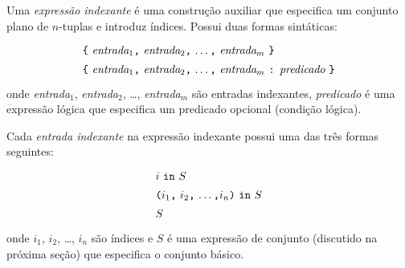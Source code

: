 \documentclass[11pt, brazil]{report}
\begin{document}
Uma {\it expressão indexante} é uma construção auxiliar que especifica um
conjunto plano de $n$-tuplas e introduz índices. Possui duas formas
sintáticas:
$$
{\def\arraystretch{1.4}
\begin{array}{l}
\mbox{{\tt\{} {\it entrada}$_1${\tt,} {\it entrada}$_2${\tt,} \dots{\tt,}
{\it entrada}$_m$ {\tt\}}}\\
\mbox{{\tt\{} {\it entrada}$_1${\tt,} {\it entrada}$_2${\tt,} \dots{\tt,}
{\it entrada}$_m$ {\tt:} {\it predicado} {\tt\}}}\\
\end{array}
}
$$
onde {\it entrada}{$_1$}, {\it entrada}{$_2$}, \dots, {\it entrada}{$_m$}
são entradas indexantes, {\it predicado} é uma expressão lógica que especifica
um predicado opcional (condição lógica).


Cada {\it entrada indexante} na expressão indexante possui uma das três
formas seguintes:
$$
{\def\arraystretch{1.4}
\begin{array}{l}
\mbox{$i$ {\tt in} $S$}\\
\mbox{{\tt(}$i_1${\tt,} $i_2${\tt,} \dots{\tt,}$i_n${\tt)} {\tt in}
$S$}\\
\mbox{$S$}\\
\end{array}
}
$$
onde $i_1$, $i_2$, \dots, $i_n$ são índices e $S$ é uma expressão de conjunto
(discutido na próxima seção) que especifica o conjunto básico.

\end{document}
